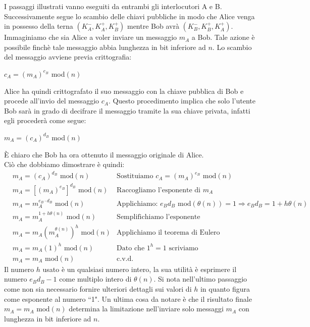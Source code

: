\documentclass[a4paper,12pt]{tesiinfo}
\begin{document}
I passaggi illustrati vanno eseguiti da entrambi gli interlocutori A e B. Successivamente segue lo scambio delle chiavi pubbliche in modo che Alice venga in possesso della terna $(K_A^-, K_A^+, K_B^+)$ mentre Bob avr\`a $(K_B^-, K_B^+, K_A^+)$. Immaginiamo che sia Alice a voler inviare un messaggio $m_A$ a Bob. Tale azione \`e possibile finch\`e tale messaggio abbia lunghezza in bit inferiore ad $n$. Lo scambio del messaggio avviene previa crittografia:
\begin{center}
 $c_A = (m_A)^{e_B}$ mod$(n)$
\end{center}
Alice ha quindi crittografato il suo messaggio con la chiave pubblica di Bob e procede all'invio del messaggio $c_A$. Questo procedimento implica che solo l'utente Bob sar\`a in grado di decifrare il messaggio tramite la sua chiave privata, infatti egli proceder\`a come segue:
\begin{center}
 $m_A = (c_A)^{d_B}$ mod$(n)$
\end{center}
\`E chiaro che Bob ha ora ottenuto il messaggio originale di Alice.
\\
Ci\`o che dobbiamo dimostrare \`e quindi:
\begin{align*}
  &m_A = (c_A)^{d_B} \text{ mod}(n) & \text{Sostituiamo $c_A = (m_A)^{e_B}$ mod$(n)$}\\
  &m_A = [(m_A)^{e_B}]^{d_B} \text{ mod}(n) & \text{Raccogliamo l'esponente di }m_A\\
  &m_A = m_A^{e_B \cdot d_B} \text{ mod}(n) & \text{Applichiamo: $e_Bd_B$ mod$(\theta(n)) = 1 \Rightarrow e_Bd_B=1+h\theta(n)$}\\
  &m_A = m_A^{1+h\theta(n)} \text{ mod}(n) & \text{Semplifichiamo l'esponente}\\
  &m_A = m_A(m_A^{\theta(n)})^h \text{ mod}(n) & \text{Applichiamo il teorema di Eulero}\\
  &m_A = m_A(1)^h \text{ mod}(n) & \text{Dato che $1^h = 1$ scriviamo}\\
  &m_A = m_A \text{ mod}(n) & \text{c.v.d.}
\end{align*}
Il numero $h$ usato \`e un qualsiasi numero intero, la sua utilit\`a \`e esprimere il numero $e_Bd_B -1$ come multiplo intero di $\theta(n)$. Si nota nell'ultimo passaggio come non sia necessario fornire ulteriori dettagli sui valori di $h$ in quanto figura come esponente al numero ``1". Un ultima cosa da notare \`e che il risultato finale $m_A = m_A \text{ mod}(n)$ determina la limitazione nell'inviare solo messaggi $m_A$ con lunghezza in bit inferiore ad $n$.
\\
\end{document}
